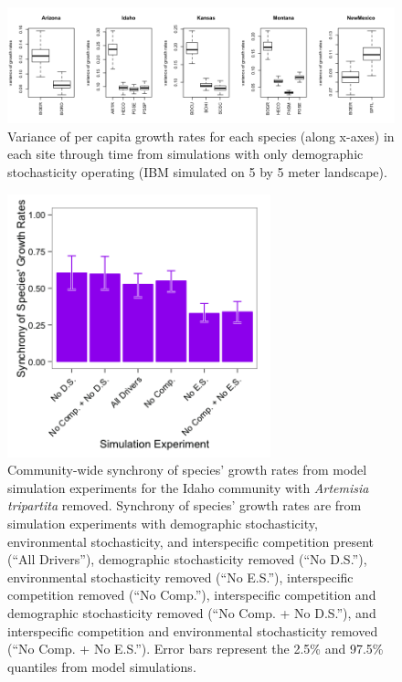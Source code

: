 \documentclass[12pt,]{article}
\begin{document}
\begin{figure}[!ht]
  \centering
      \includegraphics[width=6in]{./components/formatted_figures/demographic_variances_pgr.png}
  \caption{Variance of per capita growth rates for each species (along x-axes) in each site through time from simulations with only demographic stochasticity operating (IBM simulated on 5 by 5 meter landscape).}
\end{figure}

\pagebreak{}

\begin{figure}[!ht]
  \centering
      \includegraphics[width=3in]{./components/formatted_figures/formatted_figureS4.png}
  \caption{Community-wide synchrony of species' growth rates from model simulation experiments for the Idaho community with \textit{Artemisia tripartita} removed. Synchrony of species' growth rates are from simulation experiments with demographic stochasticity, environmental stochasticity, and interspecific competition present (``All Drivers''), demographic stochasticity removed (``No D.S.''), environmental stochasticity removed (``No E.S.''), interspecific competition removed (``No Comp.''), interspecific competition and demographic stochasticity removed (``No Comp. + No D.S.''), and interspecific competition and environmental stochasticity removed (``No Comp. + No E.S.''). Error bars represent the 2.5\% and 97.5\% quantiles from model simulations.}
\end{figure}
\end{document}
